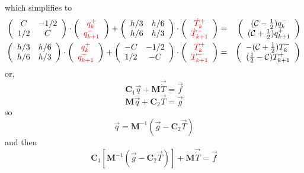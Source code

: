which simplifies to 
\begin{eqnarray}
\left(
\begin{array}{cc}
C  & -1/2 \\
1/2 & C 
\end{array}
\right)
\cdot 
\left( 
\begin{array}{cc}
    {\color{red}q_k^+}  \\
    {\color{red}q_{k+1}^-}
\end{array}
\right)
+
\left(
\begin{array}{cc}
h/3 & h/6 \\
h/6 & h/3
\end{array}
\right)
\cdot 
\left(
\begin{array}{c}
{\color{red}\dot{T}_k^+}  \\
{\color{red}\dot{T}_{k+1}^-} 
\end{array}
\right) 
&=& 
\left(
\begin{array}{cc}
     ({\cal C}-\frac{1}{2}) q_k^-  \\
     ({\cal C}+\frac{1}{2}) q_{k+1}^+ 
\end{array}
\right)
\nonumber
\\
\left(
\begin{array}{cc}
h/3 & h/6 \\
h/6 & h/3
\end{array}
\right)
\cdot
\left(
\begin{array}{cc}
    {\color{red}q_k^+}  \\
    {\color{red}q_{k+1}^-}
\end{array}
\right)+
\left(
\begin{array}{cc}
-C  & -1/2 \\
1/2 & -C
\end{array}
\right)
\cdot
\left(
\begin{array}{cc}
 {\color{red}T_k^+}  \\
{\color{red}T_{k+1}^-} 
\end{array}
\right) 
&=& \left(
\begin{array}{cc}
     -({\cal C}+\frac{1}{2})  T_k^- \\
     (\frac{1}{2}-{\cal C})  T_{k+1}^+ 
\end{array}
\right) 
\end{eqnarray}
or, 
\[
{\bm C}_1 \vec{q} +  {\bm M} \vec{\dot{T}} = \vec{f}  
\]
\[
{\bm M} \vec{q} + {\bm C}_2 \vec{T} = \vec{g}
\]
so 
\[
 \vec{q} = {\bm M}^{-1}   (\vec{g} -  {\bm C}_2 \vec{T} )
\]
and then 
\[
{\bm C}_1 [  {\bm M}^{-1}   (\vec{g} -  {\bm C}_2 \vec{T} )   ]    +  {\bm M} \vec{\dot{T}} = \vec{f}  
\]
